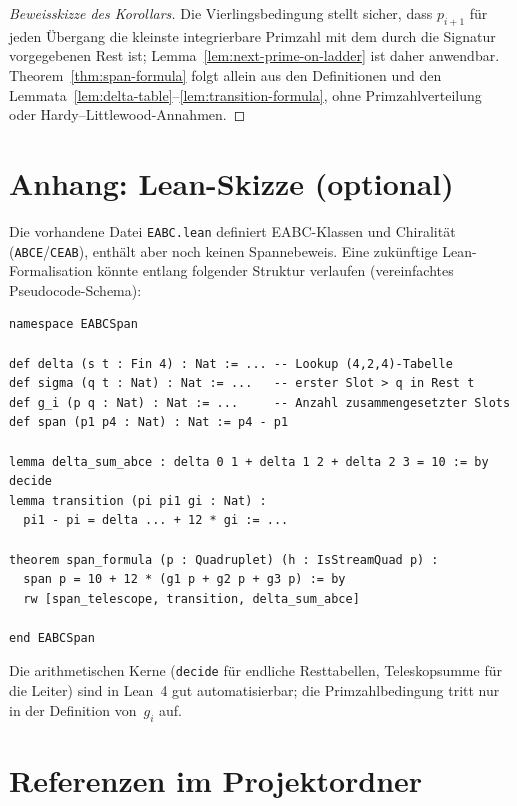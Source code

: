 \documentclass[11pt,a4paper]{article}
\begin{document}
\begin{proof}[Beweisskizze des Korollars]
Die Vierlingsbedingung stellt sicher, dass $p_{i+1}$ für jeden Übergang die
kleinste integrierbare Primzahl mit dem durch die Signatur vorgegebenen Rest
ist; Lemma~\ref{lem:next-prime-on-ladder} ist daher anwendbar.
Theorem~\ref{thm:span-formula} folgt allein aus den Definitionen und den
Lemmata~\ref{lem:delta-table}--\ref{lem:transition-formula}, ohne Primzahlverteilung
oder Hardy--Littlewood-Annahmen.
\end{proof}

\section*{Anhang: Lean-Skizze (optional)}

Die vorhandene Datei \texttt{EABC.lean} definiert EABC-Klassen und Chiralität
(\texttt{ABCE}/\texttt{CEAB}), enthält aber noch keinen Spannebeweis.
Eine zukünftige Lean-Formalisation könnte entlang folgender Struktur verlaufen
(vereinfachtes Pseudocode-Schema):

\begin{verbatim}
namespace EABCSpan

def delta (s t : Fin 4) : Nat := ... -- Lookup (4,2,4)-Tabelle
def sigma (q t : Nat) : Nat := ...   -- erster Slot > q in Rest t
def g_i (p q : Nat) : Nat := ...     -- Anzahl zusammengesetzter Slots
def span (p1 p4 : Nat) : Nat := p4 - p1

lemma delta_sum_abce : delta 0 1 + delta 1 2 + delta 2 3 = 10 := by decide
lemma transition (pi pi1 gi : Nat) :
  pi1 - pi = delta ... + 12 * gi := ...

theorem span_formula (p : Quadruplet) (h : IsStreamQuad p) :
  span p = 10 + 12 * (g1 p + g2 p + g3 p) := by
  rw [span_telescope, transition, delta_sum_abce]

end EABCSpan
\end{verbatim}

Die arithmetischen Kerne (\texttt{decide} für endliche Resttabellen, Teleskopsumme
für die Leiter) sind in Lean~4 gut automatisierbar; die Primzahlbedingung tritt
nur in der Definition von~$g_i$ auf.

\section*{Referenzen im Projektordner}
\end{document}
